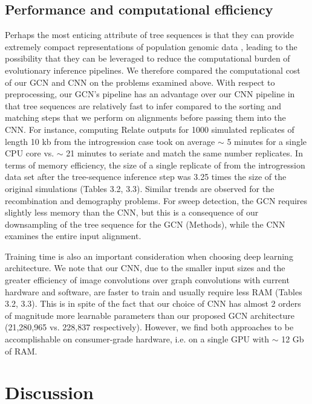 \subsection{Performance and computational efficiency}
Perhaps the most enticing attribute of tree sequences is that they can provide extremely compact representations of population genomic data \cite{kelleherInferringWholegenomeHistories2019}, leading to the possibility that they can be leveraged to reduce the computational burden of evolutionary inference pipelines. We therefore compared the computational cost of our GCN and CNN on the problems examined above. With respect to preprocessing, our GCN's pipeline has an advantage over our CNN pipeline in that tree sequences are relatively fast to infer compared to the sorting and matching steps that we perform on alignments before passing them into the CNN. For instance, computing Relate outputs for 1000 simulated replicates of length 10 kb from the introgression case took on average $\sim$ 5 minutes for a single CPU core vs. $\sim$ 21 minutes to seriate and match the same number replicates. In terms of memory efficiency, the size of a single replicate of from the introgression data set after the tree-sequence inference step was 3.25 times the size of the original simulations (Tables 3.2, 3.3). Similar trends are observed for the recombination and demography problems. For sweep detection, the GCN requires slightly less memory than the CNN, but this is a consequence of our downsampling of the tree sequence for the GCN (Methods), while the CNN examines the entire input alignment. 

Training time is also an important consideration when choosing deep learning architecture. We note that our CNN, due to the smaller input sizes and the greater efficiency of image convolutions over graph convolutions with current hardware and software, are faster to train and usually require less RAM (Tables 3.2, 3.3). This is in spite of the fact that our choice of CNN has almost 2 orders of magnitude more learnable parameters than our proposed GCN architecture (21,280,965 vs. 228,837 respectively). However, we find both approaches to be accomplishable on consumer-grade hardware, i.e. on a single GPU with $\sim$ 12 Gb of RAM. 






\section{Discussion}

